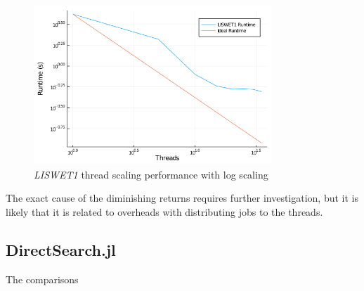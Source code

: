 \begin{figure}[tb]
    \centering
    \includegraphics[width=0.8\textwidth]{Plots/LISWET1 log Scaling.png}
    \caption{\textit{LISWET1} thread scaling performance with log scaling}
    \label{fig:liswet1_performance_log}
\end{figure}

The exact cause of the diminishing returns requires further investigation, but it is likely that it is related to overheads with distributing jobs to the threads.

\subsection{DirectSearch.jl}

The comparisons 

